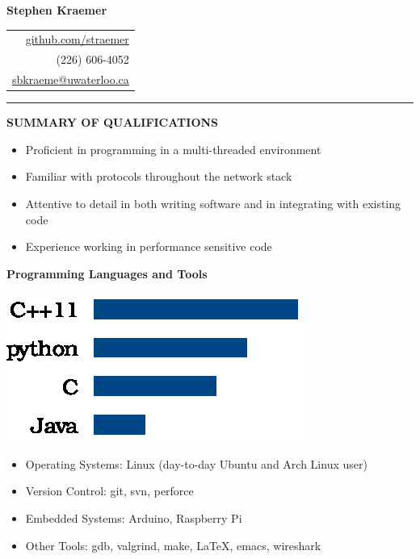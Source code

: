 \documentclass{letter}
\begin{document}
{\Huge\bf Stephen Kraemer} \hfill
\begin{tabular}{r}
  \href{https://github.com/straemer}{github.com/straemer} \\
  (226) 606-4052 \\
  \href{mailto:sbkraeme@uwaterloo.ca}{sbkraeme@uwaterloo.ca}
\end{tabular}

\vskip 2pt
\hrule

{\large\bf SUMMARY OF QUALIFICATIONS}
\begin{itemize}
  \item Proficient in programming in a multi-threaded environment
  \item Familiar with protocols throughout the network stack
  \item Attentive to detail in both writing software and in integrating with existing code
  \item Experience working in performance sensitive code
\end{itemize}

\vskip 2pt

{\bf Programming Languages and Tools}

\begin{minipage}{0.35\textwidth}
  \includegraphics{programming_languages.eps}
\end{minipage}
\begin{minipage}{0.65\textwidth}
  \begin{itemize}
    \item Operating Systems: Linux (day-to-day Ubuntu and Arch Linux user)
    \item Version Control: git, svn, perforce
    \item Embedded Systems: Arduino, Raspberry Pi
    \item Other Tools: gdb, valgrind, make, LaTeX, emacs, wireshark
  \end{itemize}
\end{minipage}
\end{document}

